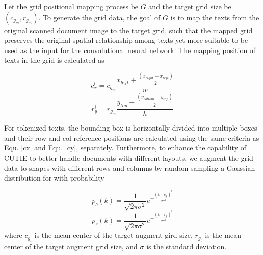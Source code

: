 \documentclass[10pt,twocolumn,letterpaper]{article}
\begin{document}
Let the grid positional mapping process be $G$ and the target grid size be $(c_{g_m}, r_{g_m})$. To generate the grid data, the goal of $G$ is to map the texts from the original scanned document image to the target grid, such that the mapped grid preserves the original spatial relationship among texts yet more suitable to be used as the input for the convolutional neural network. The mapping position of texts in the grid is calculated as

\begin{equation}
\label{cx}
c^i_x = c_{g_m} \frac{x_{left} + \frac{(x_{right} - x_{left})}{2}}{w}
\end{equation}
\begin{equation}
\label{cy}
r^i_y = r_{g_m} \frac{y_{top} + \frac{(y_{bottom} - y_{top})}{2}}{h}
\end{equation}

For tokenized texts, the bounding box is horizontally divided into multiple boxes and their row and col reference positions are calculated using the same criteria as Equ. \ref{cx} and Equ. \ref{cy}, separately. Furthermore, to enhance the capability of CUTIE to better handle documents with different layouts, we augment the grid data to shapes with different rows and columns by random sampling a Gaussian distribution for with probability

\begin{equation}
\label{augmentc}
p_c(k) = \frac{1}{\sqrt{2 \pi \sigma^2}} e^{- \frac{(k - c_{g_t})^2}{2 \sigma^2}}
\end{equation}
\begin{equation}
\label{augmentr}
p_r(k) = \frac{1}{\sqrt{2 \pi \sigma^2}} e^{- \frac{(k - r_{g_t})^2}{2 \sigma^2}}
\end{equation}
where $c_{g_t}$ is the mean center of the target augment gird size, $r_{g_t}$ is the mean center of the target augment grid size, and $\sigma$ is the standard deviation.
\end{document}

